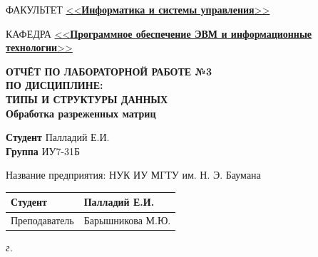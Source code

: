 \begin{titlepage}
	\begin{flushleft}
		\fontsize{12pt}{0.8\baselineskip}\selectfont 
		
		ФАКУЛЬТЕТ \uline{<<\textbf{Информатика и системы управления}>> \hfill}
		
		КАФЕДРА \uline{\mbox{\hspace{4mm}} <<\textbf{Программное обеспечение ЭВМ и информационные технологии}>> \hfill}
	\end{flushleft}
	
	\vspace{1mm}
	
	\begin{center}
		\setstretch{1.2}
		{
			\fontsize{20pt}{\baselineskip}\selectfont\bfseries
			ОТЧЁТ ПО ЛАБОРАТОРНОЙ РАБОТЕ №3 \\
			ПО ДИСЦИПЛИНЕ: \\
			ТИПЫ И СТРУКТУРЫ ДАННЫХ\\
		}
		\vspace{5mm}
		{
			\Large \bfseries
			Обработка разреженных матриц\\
		}
	\end{center}
	
	\vspace{1mm}
	
	\begin{flushleft}
		\textbf{Студент} \uline{\hspace{5cm}} Палладий Е.И. \\
		\vspace{5mm}
		\textbf{Группа} \uline{\hspace{5cm}} ИУ7-31Б \\
	\end{flushleft}
	
	\vspace{40mm}
	
	\begin{flushleft}
		Название предприятия: НУК ИУ МГТУ им. Н. Э. Баумана \\
	\end{flushleft}
	
	
	\begin{flushleft}
		\begin{tabular}{|p{}|p{0.45\textwidth}|}
			\hline
			Студент & \uline{\hspace{3cm}} Палладий Е.И. \\
			\hline
			Преподаватель & \uline{\hspace{3cm}} Барышникова М.Ю. \\
			\hline
		\end{tabular}
	\end{flushleft}
	
	
	\centering\textit{{\the\year} г.}
\end{titlepage}